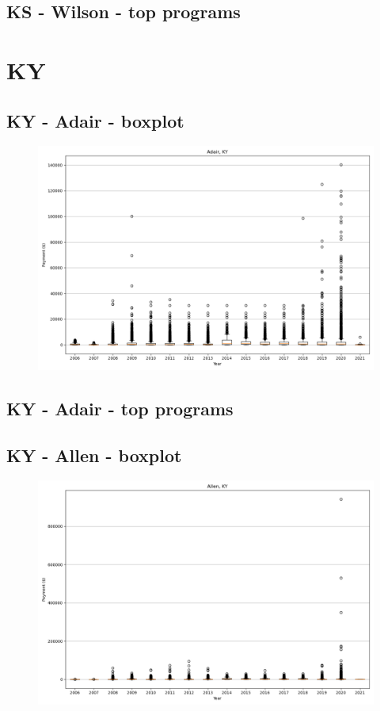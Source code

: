 \subsection*{KS - Wilson - top programs}

\newpage
\section*{KY}
\subsection*{KY - Adair - boxplot}
\begin{figure}[h]
\centering
\includegraphics[width=7in]{../output/boxplots/counties/Adair-KY_boxplot.png}
\end{figure}


\subsection*{KY - Adair - top programs}

\newpage
\subsection*{KY - Allen - boxplot}
\begin{figure}[h]
\centering
\includegraphics[width=7in]{../output/boxplots/counties/Allen-KY_boxplot.png}
\end{figure}


